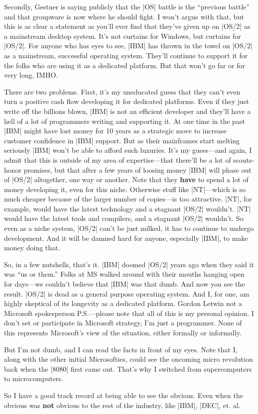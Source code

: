 Secondly, Gestner is saying publicly that the |OS| battle is the ``previous
battle'' and that groupware is now where he should fight.  I won't argue
with that, but this is as clear a statement as you'll ever find that they've
given up on |OS/2| as a mainstream desktop system.  It's not curtains for
Windows, but curtains for |OS/2|.   For anyone who has eyes to see, |IBM|
has thrown in the towel on |OS/2| as a mainstream, successful operating system.
They'll continue to support it for the folks who are using it as a
dedicated platform.  But that won't go far or for very long, IMHO.

There are two problems.  First, it's my uneducated guess that they can't
even turn a positive cash flow developing it for dedicated platforms.
Even if they just write off the billions blown, |IBM| is not an efficient
developer and they'll have a hell of a lot of programmers writing and
supporting it.  At one time in the past |IBM| might have lost money for
10 years as a strategic move to increase customer confidence in |IBM|
support.  But as their mainframes start melting seriously |IBM| won't be
able to afford such luxuries.  It's my guess---and again, I admit that
this is outside of my area of expertise---that there'll be a lot of
scouts-honor promises, but that after a few years of loosing money
|IBM| will phase out of |OS/2| altogether, one way or another.  Note that they
{\bf have} to spend a lot of money developing it, even for this niche. Otherwise
stuff like |NT|---which is so much cheaper because of the larger number
of copies---is too attractive.  |NT|, for example, would have the latest
technology and a stagnant |OS/2| wouldn't.  |NT| would have the latest tools
and compilers, and a stagnant |OS/2| wouldn't.  So even as a niche system,
|OS/2| can't be just milked, it has to continue to undergo development.
And it will be damned hard for anyone, especially |IBM|, to make money
doing that.

So, in a few nutshells, that's it.  |IBM| doomed |OS/2| years ago when
they said it was ``us or them.''  Folks at MS walked around with their
mouths hanging open for days---we couldn't believe that |IBM| was that
dumb.  And now you see the result.  |OS/2| is dead as a general purpose
operating system.  And I, for one, am highly skeptical of its longevity
as a dedicated platform.
\medskip
{\parindent=2in\parskip=1pt \obeylines Gordon Letwin
not a Microsoft spokesperson\medskip
}
\noindent P.S.---please note that all of this is my personal opinion.  I don't
set or participate in Microsoft strategy, I'm just a programmer.  
None of this represents Microsoft's view of the situation, either
formally or informally.

But I'm not dumb, and I can read the facts in front of my eyes.  Note that
I, along with the other initial Microsofties, could see the oncoming
micro revolution back when the |8080| first came out.  That's why I
switched from supercomputers to microcomputers.  

So I have a good track record at being able to see the obvious.  Even
when the obvious was {\bf not} obvious to the rest of the industry, like
|IBM|, |DEC|, et. al.
\bye

